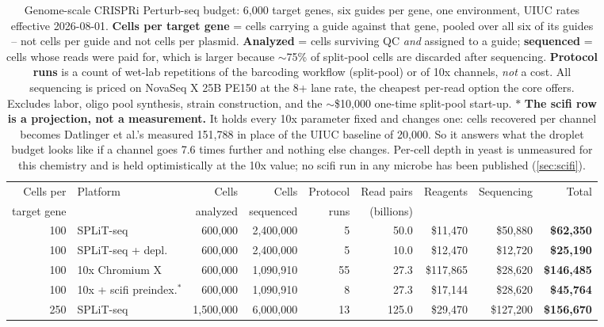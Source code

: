 \begin{table}[htbp]\centering
\footnotesize
\caption[]{Genome-scale CRISPRi Perturb-seq budget: 6{,}000 target genes, six guides per gene, one environment, UIUC rates effective 2026-08-01. \textbf{Cells per target gene} = cells carrying a guide against that gene, pooled over all six of its guides -- not cells per guide and not cells per plasmid. \textbf{Analyzed} = cells surviving QC \emph{and} assigned to a guide; \textbf{sequenced} = cells whose reads were paid for, which is larger because $\sim$75\% of split-pool cells are discarded after sequencing. \textbf{Protocol runs} is a count of wet-lab repetitions of the barcoding workflow (split-pool) or of 10x channels, \emph{not} a cost. All sequencing is priced on NovaSeq X 25B PE150 at the 8+ lane rate, the cheapest per-read option the core offers. Excludes labor, oligo pool synthesis, strain construction, and the $\sim$\$10{,}000 one-time split-pool start-up. $\ast$ \textbf{The scifi row is a projection, not a measurement.} It holds every 10x parameter fixed and changes one: cells recovered per channel becomes Datlinger et al.'s measured 151{,}788 in place of the UIUC baseline of 20{,}000. So it answers what the droplet budget looks like if a channel goes 7.6 times further and nothing else changes. Per-cell depth in yeast is unmeasured for this chemistry and is held optimistically at the 10x value; no scifi run in any microbe has been published (\cref{sec:scifi}).}\label{tab:budgets}
\begin{tabular}{rlrrrrrrr}
\toprule
Cells per & Platform & Cells & Cells & Protocol & Read pairs & Reagents & Sequencing & Total \\
target gene & & analyzed & sequenced & runs & (billions) & & & \\
\midrule
100 & SPLiT-seq & 600{,}000 & 2{,}400{,}000 & 5 & 50.0 & \$11{,}470 & \$50{,}880 & \textbf{\$62{,}350} \\
100 & SPLiT-seq + depl. & 600{,}000 & 2{,}400{,}000 & 5 & 10.0 & \$12{,}470 & \$12{,}720 & \textbf{\$25{,}190} \\
100 & 10x Chromium X & 600{,}000 & 1{,}090{,}910 & 55 & 27.3 & \$117{,}865 & \$28{,}620 & \textbf{\$146{,}485} \\
100 & 10x + scifi preindex.$^{\ast}$ & 600{,}000 & 1{,}090{,}910 & 8 & 27.3 & \$17{,}144 & \$28{,}620 & \textbf{\$45{,}764} \\
250 & SPLiT-seq & 1{,}500{,}000 & 6{,}000{,}000 & 13 & 125.0 & \$29{,}470 & \$127{,}200 & \textbf{\$156{,}670} \\

\end{tabular}
\end{table}
